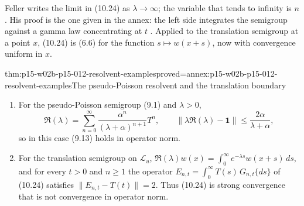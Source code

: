 Feller writes the limit in (10.24) as \(\lambda\to\infty\); the variable that
tends to infinity is \(n\). His proof is the one given in the annex: the left
side integrates the semigroup against a gamma law concentrating at \(t\)
\cite[vol.~II, XIII.10, pp.~462--463]{Feller1971ProbabilityII}. Applied to the
translation semigroup at a point \(x\), (10.24) is (6.6) for the function
\(s\mapsto w(x+s)\), now with convergence uniform in \(x\).

\begin{hbtheorem}{thm:p15-w02b-p15-012-resolvent-examples}{proved=annex:p15-w02b-p15-012-resolvent-examples}{The pseudo-Poisson resolvent and the translation boundary}
\begin{enumerate}
\item For the pseudo-Poisson semigroup (9.1) and \(\lambda>0\),
      \[
       \mathfrak R(\lambda)=\sum_{n=0}^\infty\frac{\alpha^n}{(\lambda+\alpha)^{n+1}}T^n,
       \qquad
       \|\lambda\mathfrak R(\lambda)-\mathbf 1\|\leq\frac{2\alpha}{\lambda+\alpha},
      \]
      so in this case (9.13) holds in operator norm.
\item For the translation semigroup on \(\mathscr L_u\),
      \(\mathfrak R(\lambda)w(x)=\int_0^\infty e^{-\lambda s}w(x+s)\,ds\), and
      for every \(t>0\) and \(n\geq1\) the operator
      \(E_{n,t}=\int_0^\infty T(s)\,G_{n,t}\{ds\}\) of (10.24) satisfies
      \(\|E_{n,t}-T(t)\|=2\). Thus (10.24) is strong convergence that is not
      convergence in operator norm.
\end{enumerate}
\end{hbtheorem}

